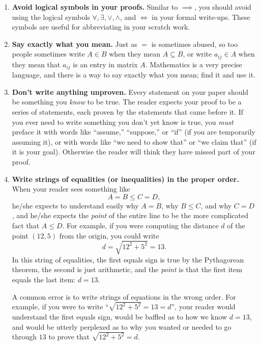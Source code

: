 \documentclass[11pt]{article}
\begin{document}
\begin{enumerate}
\item \textbf{Avoid logical symbols in your proofs.}  Similar to $\implies$, you should avoid using the logical symbols $\forall, \exists, \vee, \wedge$, and $\iff$ in your formal write-ups.  These symbols are useful for abbreviating in your scratch work. 

\item \textbf{Say exactly what you mean.}
        Just as $=$ is sometimes abused,
        so too people sometimes write $A\in B$ when they mean $A\subseteq B$,
        or write $a_{ij}\in A$ when they mean that $a_{ij}$ is an entry in matrix $A$.
        Mathematics is a very precise language, and there is a way to say exactly what you mean;
        find it and use it.

\item \textbf{Don't write anything unproven.}
        Every statement on your paper should be something you \emph{know} to be true.
        The reader expects your proof to be a series of statements, each proven by the statements that came before it.
        If you ever need to write something you don't yet know is true,
        you \emph{must} preface it with words like ``assume,'' ``suppose,'' or ``if''
        (if you are temporarily assuming it),
        or with words like ``we need to show that'' or ``we claim that'' (if it is your goal).
        Otherwise the reader will think they have missed part of your proof.

\item \textbf{Write strings of equalities (or inequalities) in the proper order.}
        When your reader sees something like
        $$A=B\leq C=D,$$
        he/she expects to understand easily why $A=B$, why $B\leq C$, and why $C=D$,
        and he/she expects the \emph{point} of the entire line to be the more complicated fact that $A\leq D$.
        For example, if you were computing the distance $d$ of the point $(12,5)$ from the origin,
        you could write
        $$d = \sqrt{12^2+5^2} = 13.$$
        In this string of equalities, the first equals sign is true by the Pythagorean theorem, 
        the second is just arithmetic, and the \emph{point} is that the first item equals the last item: $d=13$.
        
        A common error is to write strings of equations in the wrong order.
        For example, if you were to write ``$\sqrt{12^2+5^2}=13=d$'',
        your reader would understand the first equals sign,
        would be baffled as to how we know $d=13$,
        and would be utterly perplexed as to why you wanted or needed to go through $13$ to prove that $\sqrt{12^2+5^2}=d$.


\end{enumerate}
\end{document}
